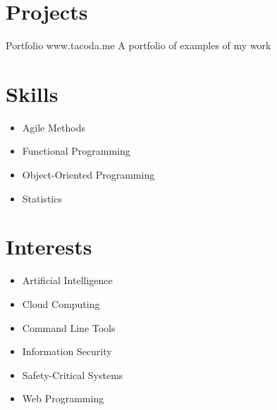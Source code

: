 \documentclass[]{cv-style}          %
\begin{document}

\section{Projects}

\begin{entrylist}
\entry
{}
{Portfolio}
{www.tacoda.me}
{A portfolio of examples of my work}
{\vspace{-0.3cm}}
\end{entrylist}


\section{Skills}
  \vspace{-0.2cm}

\begin{multicols}{2}
  \begin{itemize}
    \item Agile Methods
    \item Functional Programming
    \item Object-Oriented Programming
    \item Statistics
  \end{itemize}
\end{multicols}


\section{Interests}
  \vspace{-0.2cm}

\begin{multicols}{2}
  \begin{itemize}
    \item Artificial Intelligence
    \item Cloud Computing
    \item Command Line Tools
    \item Information Security
    \item Safety-Critical Systems
    \item Web Programming
  \end{itemize}
\end{multicols}
\end{document}
